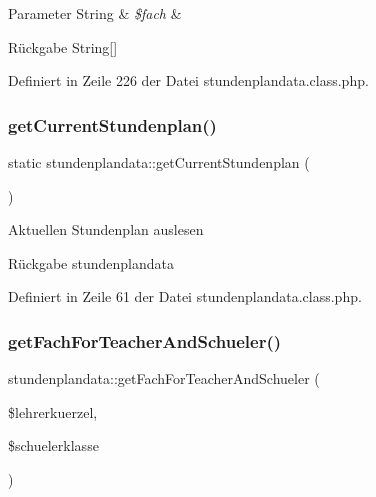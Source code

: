 \begin{DoxyParams}[1]{Parameter}
String & {\em \$fach} & \\
\hline
\end{DoxyParams}
\begin{DoxyReturn}{Rückgabe}
String\mbox{[}\mbox{]} 
\end{DoxyReturn}


Definiert in Zeile 226 der Datei stundenplandata.\+class.\+php.

\mbox{\label{classstundenplandata_ad6b7a729e0215de0326cee02d2ad34ec}} 
\subsubsection{\texorpdfstring{get\+Current\+Stundenplan()}{getCurrentStundenplan()}}
{\footnotesize\ttfamily static stundenplandata\+::get\+Current\+Stundenplan (\begin{DoxyParamCaption}{ }\end{DoxyParamCaption})\hspace{0.3cm}{\ttfamily [static]}}

Aktuellen Stundenplan auslesen \begin{DoxyReturn}{Rückgabe}
stundenplandata 
\end{DoxyReturn}


Definiert in Zeile 61 der Datei stundenplandata.\+class.\+php.

\mbox{\label{classstundenplandata_af2a1dfbc8f4fa77c9e85cd2a50027aa5}} 
\subsubsection{\texorpdfstring{get\+Fach\+For\+Teacher\+And\+Schueler()}{getFachForTeacherAndSchueler()}}
{\footnotesize\ttfamily stundenplandata\+::get\+Fach\+For\+Teacher\+And\+Schueler (\begin{DoxyParamCaption}\item[{}]{\$lehrerkuerzel,  }\item[{}]{\$schuelerklasse }\end{DoxyParamCaption})}


